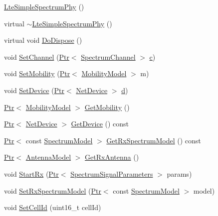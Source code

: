 \begin{DoxyCompactItemize}
\item 
\hyperlink{classns3_1_1LteSimpleSpectrumPhy_aa3f61dfd5a31f3353a87f1109855ad7d}{Lte\+Simple\+Spectrum\+Phy} ()
\item 
virtual \hyperlink{classns3_1_1LteSimpleSpectrumPhy_a5aab1ed2b0749ee992ed9c3e1efd1d03}{$\sim$\+Lte\+Simple\+Spectrum\+Phy} ()
\item 
virtual void \hyperlink{classns3_1_1LteSimpleSpectrumPhy_ad7fdafe823c89e14685a594950585acc}{Do\+Dispose} ()
\item 
void \hyperlink{classns3_1_1LteSimpleSpectrumPhy_a1aa2f70dac14d8c6d302e35fb976fea6}{Set\+Channel} (\hyperlink{classns3_1_1Ptr}{Ptr}$<$ \hyperlink{classns3_1_1SpectrumChannel}{Spectrum\+Channel} $>$ \hyperlink{mmwave_2model_2fading-traces_2fading__trace__generator_8m_ae0323a9039add2978bf5b49550572c7c}{c})
\item 
void \hyperlink{classns3_1_1LteSimpleSpectrumPhy_adc0d464bd44ea2356dd523746f042287}{Set\+Mobility} (\hyperlink{classns3_1_1Ptr}{Ptr}$<$ \hyperlink{classns3_1_1MobilityModel}{Mobility\+Model} $>$ m)
\item 
void \hyperlink{classns3_1_1LteSimpleSpectrumPhy_a066184572db96c482f7c3635a2cade01}{Set\+Device} (\hyperlink{classns3_1_1Ptr}{Ptr}$<$ \hyperlink{classns3_1_1NetDevice}{Net\+Device} $>$ \hyperlink{lte__pathloss_8m_a1aabac6d068eef6a7bad3fdf50a05cc8}{d})
\item 
\hyperlink{classns3_1_1Ptr}{Ptr}$<$ \hyperlink{classns3_1_1MobilityModel}{Mobility\+Model} $>$ \hyperlink{classns3_1_1LteSimpleSpectrumPhy_a912ec7981fbb952cba291d1fc0a70ad9}{Get\+Mobility} ()
\item 
\hyperlink{classns3_1_1Ptr}{Ptr}$<$ \hyperlink{classns3_1_1NetDevice}{Net\+Device} $>$ \hyperlink{classns3_1_1LteSimpleSpectrumPhy_a72d6fe3e7fc046de4d7fa212de71ee21}{Get\+Device} () const 
\item 
\hyperlink{classns3_1_1Ptr}{Ptr}$<$ const \hyperlink{classns3_1_1SpectrumModel}{Spectrum\+Model} $>$ \hyperlink{classns3_1_1LteSimpleSpectrumPhy_ab24ed232b6b6b688105f6b0592a8bcb1}{Get\+Rx\+Spectrum\+Model} () const 
\item 
\hyperlink{classns3_1_1Ptr}{Ptr}$<$ \hyperlink{classns3_1_1AntennaModel}{Antenna\+Model} $>$ \hyperlink{classns3_1_1LteSimpleSpectrumPhy_a3e1d9ce5ef4595ff7d1f9de04983e81f}{Get\+Rx\+Antenna} ()
\item 
void \hyperlink{classns3_1_1LteSimpleSpectrumPhy_afcf7377f41c3ae69428d9c2037972183}{Start\+Rx} (\hyperlink{classns3_1_1Ptr}{Ptr}$<$ \hyperlink{structns3_1_1SpectrumSignalParameters}{Spectrum\+Signal\+Parameters} $>$ params)
\item 
void \hyperlink{classns3_1_1LteSimpleSpectrumPhy_a1cbc14b5951a6c9360d3b180760429d9}{Set\+Rx\+Spectrum\+Model} (\hyperlink{classns3_1_1Ptr}{Ptr}$<$ const \hyperlink{classns3_1_1SpectrumModel}{Spectrum\+Model} $>$ model)
\item 
void \hyperlink{classns3_1_1LteSimpleSpectrumPhy_aed3e4883b1f03358a744746b08fbd5d8}{Set\+Cell\+Id} (uint16\+\_\+t cell\+Id)
\end{DoxyCompactItemize}
